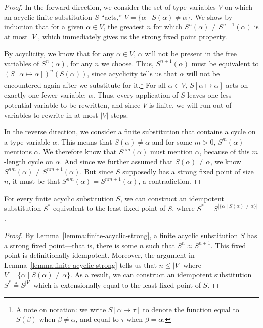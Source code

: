 \documentclass[10pt, letterpaper, oneside]{article}
\begin{document}
\begin{proof}
  In the forward direction, we consider the set of type variables \(V\) on which an acyclic finite substitution \(S\) ``acts,'' \(V = \{\alpha \mid S(\alpha) \ne \alpha\}\). We show by induction that for a given \(\alpha \in V\), the greatest \(n\) for which \(S^n(\alpha) \ne S^{n + 1}(\alpha)\) is at most \(|V|\), which immediately gives us the strong fixed point property.

  By acyclicity, we know that for any \(\alpha \in V\), \(\alpha\) will not be present in the free variables of \(S^n(\alpha)\), for any \(n\) we choose. Thus, \(S^{n + 1}(\alpha)\) must be equivalent to \((S[\alpha \mapsto \alpha])^n(S(\alpha))\), since acyclicity tells us that \(\alpha\) will not be encountered again after we substitute for it.\footnote{A note on notation: we write \(S[\alpha \mapsto \tau]\) to denote the function equal to \(S(\beta)\) when \(\beta \ne \alpha\), and equal to \(\tau\) when \(\beta = \alpha\).} For all \(\alpha \in V\), \(S[\alpha \mapsto \alpha]\) acts on exactly one fewer variable: \(\alpha\). Thus, every application of \(S\) leaves one less potential variable to be rewritten, and since \(V\) is finite, we will run out of variables to rewrite in at most \(|V|\) steps.

  In the reverse direction, we consider a finite substitution that contains a cycle on a type variable \(\alpha\). This means that \(S(\alpha) \ne \alpha\) and for some \(m > 0\), \(S^m(\alpha)\) mentions \(\alpha\). We therefore know that \(S^{nm}(\alpha)\) must mention \(\alpha\), because of this \(m\)-length cycle on \(\alpha\). And since we further assumed that \(S(\alpha) \ne \alpha\), we know \(S^{nm}(\alpha) \ne S^{nm + 1}(\alpha)\). But since \(S\) supposedly has a strong fixed point of size \(n\), it must be that \(S^{nm}(\alpha) = S^{nm + 1}(\alpha)\), a contradiction.
\end{proof}

\begin{corollary}
  \label{corollary:idempotize}
  For every finite acyclic substitution \(S\), we can construct an idempotent substitution \(S^\ast\) equivalent to the least fixed point of \(S\), where \(S^\ast = S^{|\{\alpha \mid S(\alpha) \ne \alpha\}|}\).
\end{corollary}

\begin{proof}
  By Lemma~\ref{lemma:finite-acyclic-strong}, a finite acyclic substitution \(S\) has a strong fixed point---that is, there is some \(n\) such that \(S^n \approx S^{n + 1}\). This fixed point is definitionally idempotent. Moreover, the argument in Lemma~\ref{lemma:finite-acyclic-strong} tells us that \(n \le |V|\) where \(V = \{\alpha \mid S(\alpha) \ne \alpha\}\). As a result, we can construct an idempotent substitution \(S^\ast \triangleq S^{|V|}\) which is extensionally equal to the least fixed point of \(S\).
\end{proof}
\end{document}
